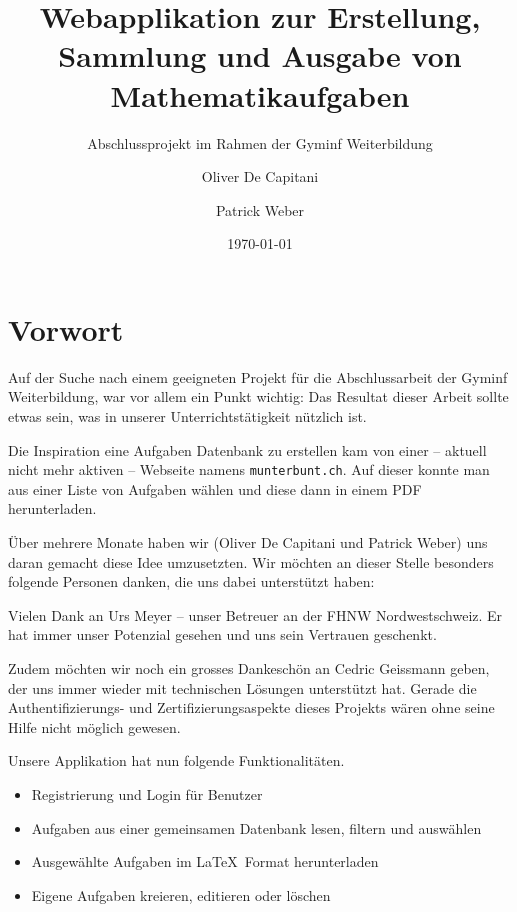\documentclass[12pt,a4paper]{scrartcl} %
\title{Webapplikation zur Erstellung, Sammlung und Ausgabe von Mathematikaufgaben}
\subtitle{Abschlussprojekt im Rahmen der Gyminf Weiterbildung}
\date{\today}
\author{Oliver De Capitani \and Patrick Weber}
\begin{document}
\maketitle %
% 



\newpage %
\tableofcontents %




\newpage


\section{Vorwort}

Auf der Suche nach einem geeigneten Projekt für die Abschlussarbeit der Gyminf Weiterbildung, war vor allem ein Punkt wichtig: Das Resultat dieser Arbeit sollte etwas sein, was in unserer Unterrichtstätigkeit nützlich ist. 

Die Inspiration eine Aufgaben Datenbank zu erstellen kam von einer -- aktuell nicht mehr aktiven -- Webseite namens \verb|munterbunt.ch|. Auf dieser konnte man aus einer Liste von Aufgaben wählen und diese dann in einem PDF herunterladen. 

Über mehrere Monate haben wir (Oliver De Capitani und Patrick Weber) uns daran gemacht diese Idee umzusetzten. Wir möchten an dieser Stelle besonders folgende Personen danken, die uns dabei unterstützt haben: 

Vielen Dank an Urs Meyer -- unser Betreuer an der FHNW Nordwestschweiz. Er hat immer unser Potenzial gesehen und uns sein Vertrauen geschenkt. 

Zudem möchten wir noch ein grosses Dankeschön an Cedric Geissmann geben, der uns immer wieder mit technischen Lösungen unterstützt hat. Gerade die Authentifizierungs- und Zertifizierungsaspekte dieses Projekts wären ohne seine Hilfe nicht möglich gewesen.

Unsere Applikation hat nun folgende Funktionalitäten.
\begin{itemize}
  \item Registrierung und Login für Benutzer
  \item Aufgaben aus einer gemeinsamen Datenbank lesen, filtern und auswählen
  \item Ausgewählte Aufgaben im \LaTeX\  Format herunterladen
  \item Eigene Aufgaben kreieren, editieren oder löschen
\end{itemize}
\end{document}
